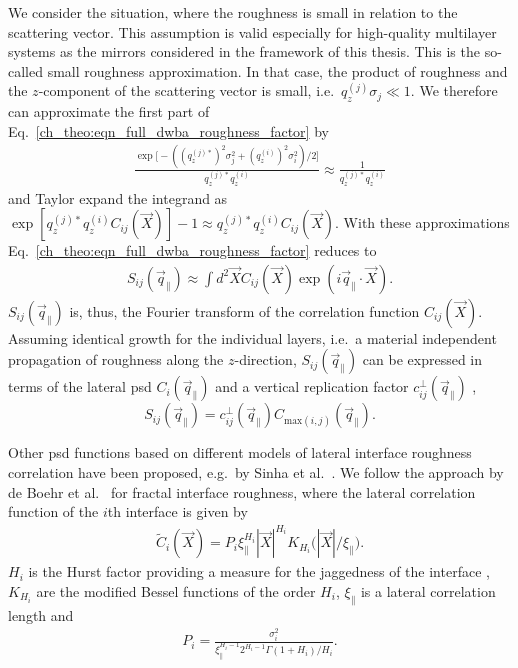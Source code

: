 We consider the situation, where the roughness is small in relation to the scattering vector. This assumption is valid especially for high-quality multilayer systems as the mirrors considered in the framework of this thesis. This is the so-called small roughness approximation. In that case, the product of roughness and the $z$-component of the scattering vector is small, i.e.~$q_z^{(j)} \sigma_j \ll 1$. We therefore can approximate the first part of Eq.~\eqref{ch_theo:eqn_full_dwba_roughness_factor} by
\begin{align}
\frac{\exp \Big[-((q_z^{(j)*})^2 \sigma_j^2 + (q_z^{(i)})^{2} \sigma_i^2)/2\Big]}{q_z^{(j)*} q_z^{(i)}} \approx \frac{1}{q_z^{(j)*} q_z^{(i)}}
\end{align}
and Taylor expand the integrand as $\exp [q_z^{(j)*} q_z^{(i)} C_{ij}(\vec{X})]-1 \approx q_z^{(j)*} q_z^{(i)} C_{ij}(\vec{X})$. With these approximations Eq.~\eqref{ch_theo:eqn_full_dwba_roughness_factor} reduces to
\begin{align}
S_{ij}(\vec{q}_\parallel) \approx \int d^2 \vec{X} C_{ij}(\vec{X}) \exp(i \vec{q}_\parallel \cdot \vec{X}) \text{.} \label{eqn:reduced_structure_factor}
\end{align}
$S_{ij}(\vec{q}_\parallel)$ is, thus, the Fourier transform of the correlation function $C_{ij}(\vec{X})$. Assuming identical growth for the individual layers, i.e.~a material independent propagation of roughness along the $z$-direction, $S_{ij}(\vec{q}_\parallel)$ can be expressed in terms of the lateral \gls{psd} $C_{i}(\vec{q}_\parallel)$ and a vertical replication factor $c_{ij}^{\perp}(\vec{q}_\parallel)$ \cite{spiller_multilayer_1993},
\begin{equation}
        S_{ij}(\vec{q}_\parallel) = c_{ij}^{\perp}(\vec{q}_\parallel) C_{\text{max}(i,j)}(\vec{q}_\parallel)\text{.} \label{eqn:factorized_structure_factor}
\end{equation}

Other \gls{psd} functions based on different models of lateral interface roughness correlation have been proposed, e.g.~by Sinha et al.~\cite{sinha_x-ray_1988}. We follow the approach by de Boehr et al.~\cite{boer_influence_1994,de_boer_x-ray_1995} for fractal interface roughness, where the lateral correlation function of the $i$th interface is given by
\begin{align}
\tilde{C}_i(\vec{X}) = P_i \xi_\parallel^{H_i} |\vec{X}|^{H_i} K_{H_i}\Big(|\vec{X}|/\xi_\parallel\Big) \text{.} \label{eqn:lateral_correlation_function}
\end{align}
$H_i$ is the Hurst factor providing a measure for the jaggedness of the interface \cite{sinha_x-ray_1988}, $K_{H_i}$ are the modified Bessel functions of the order $H_i$, $\xi_\parallel$ is a lateral correlation length and
\begin{align}
P_i = \frac{\sigma_i^2}{\xi_\parallel^{H_i-1} 2^{H_i-1} \Gamma(1+H_i)/H_i}\text{.}
\end{align}

